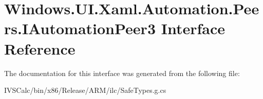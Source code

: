 \hypertarget{interface_windows_1_1_u_i_1_1_xaml_1_1_automation_1_1_peers_1_1_i_automation_peer3}{}\section{Windows.\+U\+I.\+Xaml.\+Automation.\+Peers.\+I\+Automation\+Peer3 Interface Reference}
\label{interface_windows_1_1_u_i_1_1_xaml_1_1_automation_1_1_peers_1_1_i_automation_peer3}


The documentation for this interface was generated from the following file\+:\begin{DoxyCompactItemize}
\item 
I\+V\+S\+Calc/bin/x86/\+Release/\+A\+R\+M/ilc/Safe\+Types.\+g.\+cs\end{DoxyCompactItemize}
